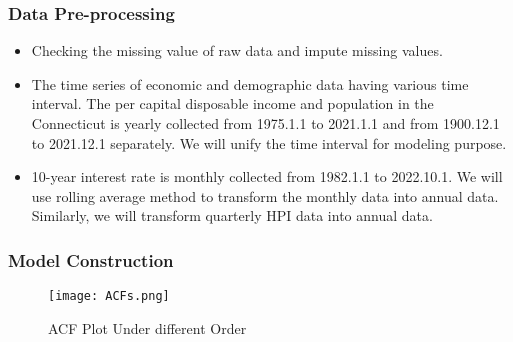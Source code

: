 \documentclass{beamer}
\begin{document}
\begin{frame}
\frametitle{Data Pre-processing}
\begin{itemize}
    \item Checking the missing value of raw data and impute missing values.
    \item The time series of economic and demographic data having various time interval. The per capital disposable income and population in the Connecticut is yearly collected from 1975.1.1 to 2021.1.1 and from 1900.12.1 to 2021.12.1 separately. We will unify the time interval for modeling purpose.
    \item 10-year interest rate is monthly collected from 1982.1.1 to 2022.10.1. We will use rolling average method to transform the monthly data into annual data. Similarly, we will transform quarterly HPI data into annual data.
\end{itemize}
\end{frame}





\begin{frame}
\frametitle{Model Construction}
\begin{figure}
\texttt{[image: ACFs.png]}
\caption{ACF Plot Under different Order}
\end{figure}
\end{frame}
\end{document}
